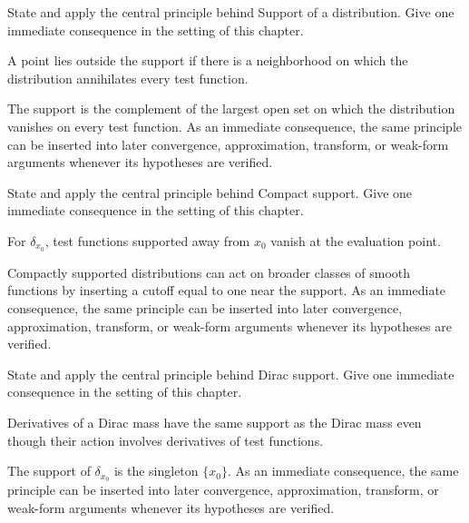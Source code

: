 \begin{exercise}\label{exr:iii17-01}
State and apply the central principle behind Support of a distribution. Give one immediate consequence in the setting of this chapter.
\end{exercise}
\begin{hint}
A point lies outside the support if there is a neighborhood on which the distribution annihilates every test function.
\end{hint}
\begin{solution}
The support is the complement of the largest open set on which the distribution vanishes on every test function. As an immediate consequence, the same principle can be inserted into later convergence, approximation, transform, or weak-form arguments whenever its hypotheses are verified.
\end{solution}

\begin{exercise}\label{exr:iii17-02}
State and apply the central principle behind Compact support. Give one immediate consequence in the setting of this chapter.
\end{exercise}
\begin{hint}
For \(\delta_{x_0}\), test functions supported away from \(x_0\) vanish at the evaluation point.
\end{hint}
\begin{solution}
Compactly supported distributions can act on broader classes of smooth functions by inserting a cutoff equal to one near the support. As an immediate consequence, the same principle can be inserted into later convergence, approximation, transform, or weak-form arguments whenever its hypotheses are verified.
\end{solution}

\begin{exercise}\label{exr:iii17-03}
State and apply the central principle behind Dirac support. Give one immediate consequence in the setting of this chapter.
\end{exercise}
\begin{hint}
Derivatives of a Dirac mass have the same support as the Dirac mass even though their action involves derivatives of test functions.
\end{hint}
\begin{solution}
The support of $\delta_{x_0}$ is the singleton $\{x_0\}$. As an immediate consequence, the same principle can be inserted into later convergence, approximation, transform, or weak-form arguments whenever its hypotheses are verified.
\end{solution}

